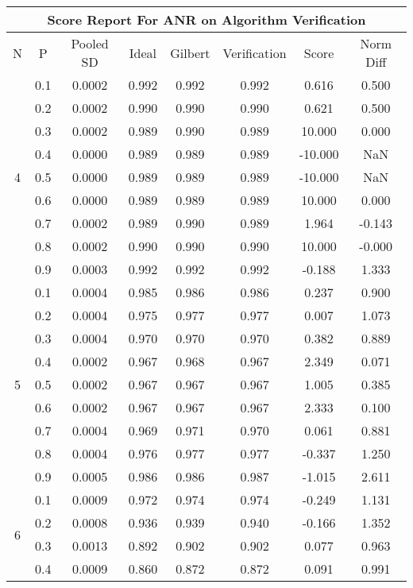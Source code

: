 \documentclass[11pt,a4paper]{report}
\begin{document}
\begin{longtable}{ | c | c || c | c | c | c | c | c | }
\hline
\multicolumn{8}{|c|}{ Score Report For ANR on Algorithm Verification} \\
\hline
N & P & Pooled SD &  Ideal &  Gilbert & Verification  & Score & Norm Diff \\
 \hline
 \hline
 \endhead
\multirow{9}{*}{4} & 0.1 & 0.0002 & 0.992 & 0.992 & 0.992 & 0.616 & 0.500 \\
 & 0.2 & 0.0002 & 0.990 & 0.990 & 0.990 & 0.621 & 0.500 \\
 & 0.3 & 0.0002 & 0.989 & 0.990 & 0.989 & 10.000 & 0.000 \\
 & 0.4 & 0.0000 & 0.989 & 0.989 & 0.989 & -10.000 & NaN \\
 & 0.5 & 0.0000 & 0.989 & 0.989 & 0.989 & -10.000 & NaN \\
 & 0.6 & 0.0000 & 0.989 & 0.989 & 0.989 & 10.000 & 0.000 \\
 & 0.7 & 0.0002 & 0.989 & 0.990 & 0.989 & 1.964 & -0.143 \\
 & 0.8 & 0.0002 & 0.990 & 0.990 & 0.990 & 10.000 & -0.000 \\
 & 0.9 & 0.0003 & 0.992 & 0.992 & 0.992 & -0.188 & 1.333 \\
 \hline
\multirow{9}{*}{5} & 0.1 & 0.0004 & 0.985 & 0.986 & 0.986 & 0.237 & 0.900 \\
 & 0.2 & 0.0004 & 0.975 & 0.977 & 0.977 & 0.007 & 1.073 \\
 & 0.3 & 0.0004 & 0.970 & 0.970 & 0.970 & 0.382 & 0.889 \\
 & 0.4 & 0.0002 & 0.967 & 0.968 & 0.967 & 2.349 & 0.071 \\
 & 0.5 & 0.0002 & 0.967 & 0.967 & 0.967 & 1.005 & 0.385 \\
 & 0.6 & 0.0002 & 0.967 & 0.967 & 0.967 & 2.333 & 0.100 \\
 & 0.7 & 0.0004 & 0.969 & 0.971 & 0.970 & 0.061 & 0.881 \\
 & 0.8 & 0.0004 & 0.976 & 0.977 & 0.977 & -0.337 & 1.250 \\
 & 0.9 & 0.0005 & 0.986 & 0.986 & 0.987 & -1.015 & 2.611 \\
 \hline
\multirow{9}{*}{6} & 0.1 & 0.0009 & 0.972 & 0.974 & 0.974 & -0.249 & 1.131 \\
 & 0.2 & 0.0008 & 0.936 & 0.939 & 0.940 & -0.166 & 1.352 \\
 & 0.3 & 0.0013 & 0.892 & 0.902 & 0.902 & 0.077 & 0.963 \\
 & 0.4 & 0.0009 & 0.860 & 0.872 & 0.872 & 0.091 & 0.991 \\

\end{longtable}
\end{document}
